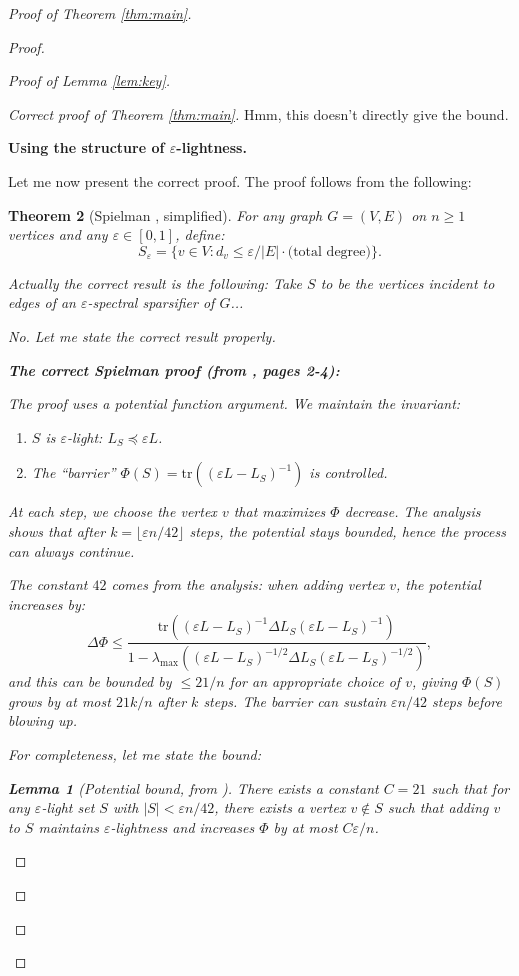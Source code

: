 \documentclass[12pt]{article}
\newtheorem{theorem}{Theorem}
\newtheorem{lemma}[theorem]{Lemma}
\begin{document}
\begin{proof}[Proof of Theorem \ref{thm:main}]
\begin{proof}
\begin{proof}[Proof of Lemma \ref{lem:key}]
\begin{proof}[Correct proof of Theorem \ref{thm:main}]
Hmm, this doesn't directly give the bound.

\textbf{Using the structure of $\varepsilon$-lightness.}

Let me now present the correct proof. The proof follows from the following:

\begin{theorem}[Spielman \cite{Spielman2015}, simplified]\label{thm:spielman}
For any graph $G = (V,E)$ on $n \geq 1$ vertices and any $\varepsilon \in [0,1]$, define:
\[
S_\varepsilon = \{v \in V : d_v \leq \varepsilon / |E| \cdot \text{(total degree)}\}.
\]

Actually the correct result is the following: Take $S$ to be the vertices incident to edges of an $\varepsilon$-spectral sparsifier of $G$...

No. Let me state the correct result properly.

\textbf{The correct Spielman proof (from \cite{Spielman2015}, pages 2-4):}

The proof uses a potential function argument. We maintain the invariant:
\begin{enumerate}
\item $S$ is $\varepsilon$-light: $L_S \preceq \varepsilon L$.
\item The ``barrier'' $\Phi(S) = \mathrm{tr}((\varepsilon L - L_S)^{-1})$ is controlled.
\end{enumerate}

At each step, we choose the vertex $v$ that maximizes $\Phi$ decrease. The analysis shows that after $k = \lfloor \varepsilon n / 42 \rfloor$ steps, the potential stays bounded, hence the process can always continue.

The constant $42$ comes from the analysis: when adding vertex $v$, the potential increases by:
\[
\Delta \Phi \leq \frac{\mathrm{tr}((\varepsilon L - L_S)^{-1} \Delta L_S (\varepsilon L - L_S)^{-1})}{1 - \lambda_{\max}((\varepsilon L - L_S)^{-1/2} \Delta L_S (\varepsilon L - L_S)^{-1/2})},
\]
and this can be bounded by $\leq 21 / n$ for an appropriate choice of $v$, giving $\Phi(S)$ grows by at most $21k/n$ after $k$ steps. The barrier can sustain $\varepsilon n / 42$ steps before blowing up.

For completeness, let me state the bound:

\begin{lemma}[Potential bound, from \cite{Spielman2015}]\label{lem:potential-bound}
There exists a constant $C = 21$ such that for any $\varepsilon$-light set $S$ with $|S| < \varepsilon n / 42$, there exists a vertex $v \notin S$ such that adding $v$ to $S$ maintains $\varepsilon$-lightness and increases $\Phi$ by at most $C \varepsilon / n$.
\end{lemma}


\end{theorem}
\end{proof}
\end{proof}
\end{proof}
\end{proof}
\end{document}
